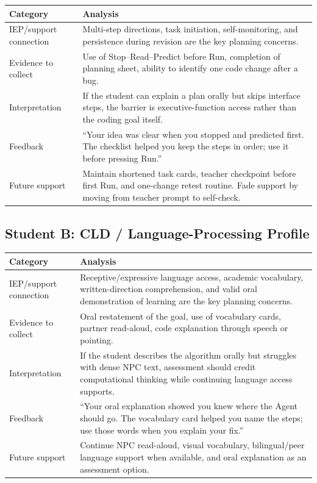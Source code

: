 \documentclass[12pt]{article}
\begin{document}
\begin{xltabular}{\textwidth}{|P{1.4in}|L|}
\hline
{}\color{white}\bfseries Category & \color{white}\bfseries Analysis \\
\hline
IEP/support connection & Multi-step directions, task initiation, self-monitoring, and persistence during revision are the key planning concerns. \\
\hline
{} Evidence to collect & Use of Stop--Read--Predict before Run, completion of planning sheet, ability to identify one code change after a bug. \\
\hline
Interpretation & If the student can explain a plan orally but skips interface steps, the barrier is executive-function access rather than the coding goal itself. \\
\hline
{} Feedback & ``Your idea was clear when you stopped and predicted first. The checklist helped you keep the steps in order; use it before pressing Run.'' \\
\hline
Future support & Maintain shortened task cards, teacher checkpoint before first Run, and one-change retest routine. Fade support by moving from teacher prompt to self-check. \\
\hline
\end{xltabular}

\newpage
\subsection{Student B: CLD / Language-Processing Profile}

\begin{xltabular}{\textwidth}{|P{1.4in}|L|}
\hline
{}\color{white}\bfseries Category & \color{white}\bfseries Analysis \\
\hline
IEP/support connection & Receptive/expressive language access, academic vocabulary, written-direction comprehension, and valid oral demonstration of learning are the key planning concerns. \\
\hline
{} Evidence to collect & Oral restatement of the goal, use of vocabulary cards, partner read-aloud, code explanation through speech or pointing. \\
\hline
Interpretation & If the student describes the algorithm orally but struggles with dense NPC text, assessment should credit computational thinking while continuing language access supports. \\
\hline
{} Feedback & ``Your oral explanation showed you knew where the Agent should go. The vocabulary card helped you name the steps; use those words when you explain your fix.'' \\
\hline
Future support & Continue NPC read-aloud, visual vocabulary, bilingual/peer language support when available, and oral explanation as an assessment option. \\
\hline
\end{xltabular}
\end{document}
